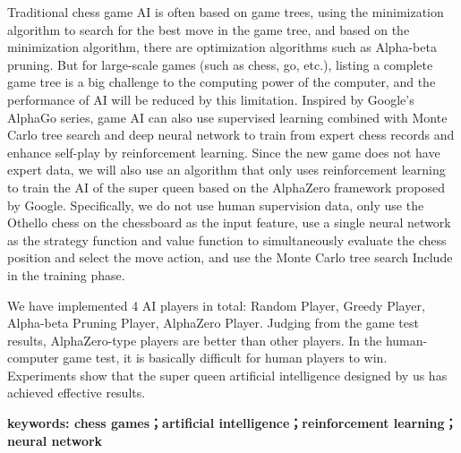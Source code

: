 Traditional chess game AI is often based on game trees, using the minimization algorithm to search for the best move in the game tree, and based on the minimization algorithm, there are optimization algorithms such as Alpha-beta pruning. But for large-scale games (such as chess, go, etc.), listing a complete game tree is a big challenge to the computing power of the computer, and the performance of AI will be reduced by this limitation. Inspired by Google's AlphaGo series, game AI can also use supervised learning combined with Monte Carlo tree search and deep neural network to train from expert chess records and enhance self-play by reinforcement learning.
Since the new game does not have expert data, we will also use an algorithm that only uses reinforcement learning to train the AI ​​of the super queen based on the AlphaZero framework proposed by Google. Specifically, we do not use human supervision data, only use the Othello chess on the chessboard as the input feature, use a single neural network as the strategy function and value function to simultaneously evaluate the chess position and select the move action, and use the Monte Carlo tree search Include in the training phase.


We have implemented 4 AI players in total: Random Player, Greedy Player, Alpha-beta Pruning Player, AlphaZero Player. Judging from the game test results, AlphaZero-type players are better than other players. In the human-computer game test, it is basically difficult for human players to win. Experiments show that the super queen artificial intelligence designed by us has achieved effective results.

\noindent\textbf{keywords: chess games；artificial intelligence；reinforcement learning；neural network}